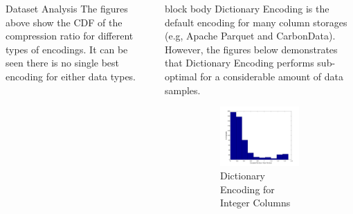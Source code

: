 \documentclass{beamer}
\newlength{\sepwid}
\newlength{\onecolwid}
\begin{document}
\begin{frame}[t]
\begin{columns}[t]
\begin{column}{\onecolwid}
\begin{block}{Dataset Analysis}
The figures above show the CDF of the compression ratio for different types of
encodings. It can be seen there is no single best encoding for either data
types.

\end{block}

\end{column}

\begin{column}{\sepwid}\end{column} %

\begin{column}{\onecolwid} %
\begin{beamercolorbox}{block body}
Dictionary Encoding is the default encoding for many column storages (e.g,
Apache Parquet and CarbonData). However, the figures below demonstrates that
Dictionary Encoding performs sub-optimal for a considerable amount of data
samples.
\end{beamercolorbox}
\begin{figure}
\begin{subfigure}{0.45\textwidth}
\includegraphics[scale=0.9]{img/integer_dict_hist}
\caption{Dictionary Encoding for Integer Columns}
\end{subfigure}~
\begin{subfigure}{0.45\textwidth}

\end{subfigure}
\end{figure}
\end{column}
\end{columns}
\end{frame}
\end{document}
